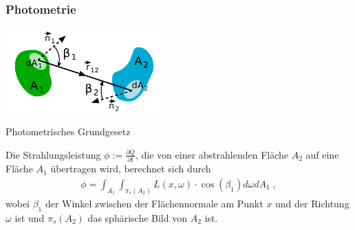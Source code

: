 \documentclass{beamer}
\begin{document}
\begin{frame}
    \frametitle{Photometrie}
\framesubtitle{}
  \begin{center}

    \includegraphics[width=0.45\textwidth]{images/Fotometrisches_Grundgesetz_Schema.png}
\end{center}


\begin{block}{Photometrisches Grundgesetz}

Die Strahlungsleistung $\phi:= \frac{ \partial Q}{\partial t}$, die von einer abstrahlenden Fläche $A_2$  auf eine Fläche $A_1$ übertragen wird, berechnet sich durch
\begin{align}
\phi = \int_{A_1} \int_{\pi_s(A_2)} L(x, \omega)\cdot \cos(\beta_1) d\omega  dA_1   \; ,
\end{align}
wobei $\beta_1$ der Winkel zwischen der Flächennormale am Punkt $x$ und der Richtung $\omega$ ist und $\pi_s(A_2)$ das sphärische Bild von $A_2$ ist.
\end{block}
\end{frame}
\end{document}
